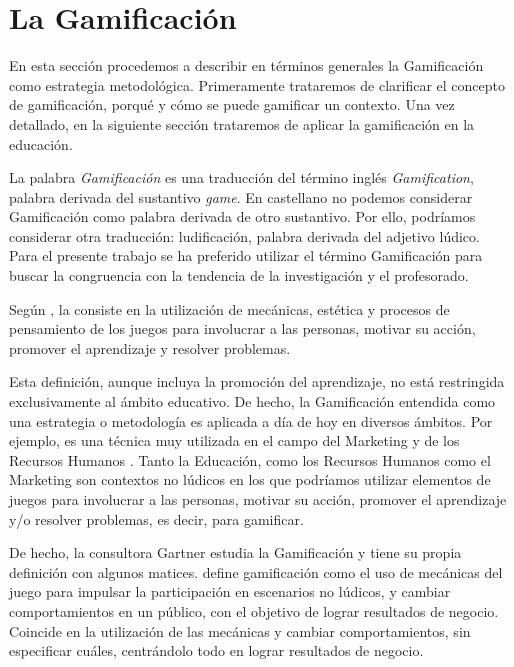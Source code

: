 
\section{La Gamificación}




En esta sección procedemos a describir en términos generales la Gamificación como estrategia metodológica.
%
Primeramente trataremos de clarificar el concepto de gamificación, porqué y cómo se puede gamificar un contexto.
%
Una vez detallado, en la siguiente sección trataremos de aplicar la gamificación en la educación.


La palabra \textit{Gamificación} es una traducción del término inglés \textit{Gamification}, palabra derivada del sustantivo \textit{game}.
%
En castellano no podemos considerar Gamificación como palabra derivada de otro sustantivo. Por ello, podríamos considerar otra traducción: ludificación, palabra derivada del adjetivo lúdico.
%
Para el presente trabajo se ha preferido utilizar el término Gamificación para buscar la congruencia con la tendencia de la investigación y el profesorado.



Según  \cite{GamificationDef}, la  consiste en la utilización de mecánicas, estética y procesos de pensamiento de los juegos para involucrar a las personas, motivar su acción, promover el aprendizaje y resolver problemas.

Esta definición, aunque incluya la promoción del aprendizaje, no está restringida exclusivamente al ámbito educativo. 
%
De hecho, la Gamificación entendida como una estrategia o metodología es aplicada a día de hoy en diversos ámbitos. 
%
Por ejemplo, es una técnica muy utilizada en el campo del Marketing  \citep{GamifyMark} y de los Recursos Humanos  \citep{GamifyHR}.
%
Tanto la Educación, como los Recursos Humanos como el Marketing son contextos no lúdicos en los que podríamos utilizar elementos de juegos para involucrar a las personas, motivar su acción, promover el aprendizaje y/o resolver problemas, es decir, para gamificar.

De hecho, la consultora Gartner estudia la Gamificación y tiene su propia definición con algunos matices.
%
 \cite{Gartner} define gamificación como el uso de mecánicas del juego para impulsar la participación en escenarios no lúdicos, y cambiar comportamientos en un público, con el objetivo de lograr resultados de negocio.
%
Coincide en la utilización de las mecánicas y cambiar comportamientos, sin especificar cuáles, centrándolo todo en lograr resultados de negocio.

